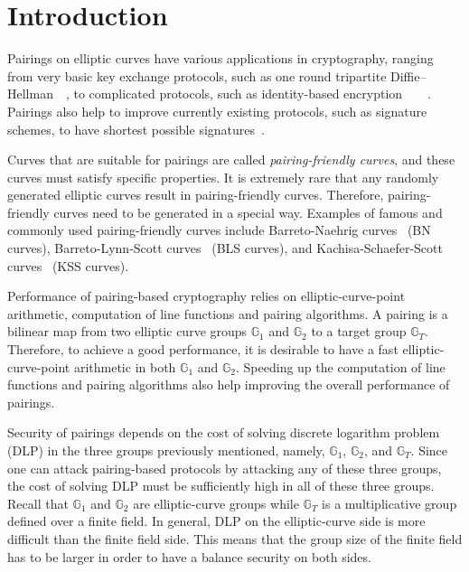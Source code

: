 \section{Introduction}
\label{sec:intro}

Pairings on elliptic curves have various applications in cryptography,
ranging from very basic key exchange protocols,
such as one round tripartite Diffie--Hellman~\cite{2000/joux-ants}~\cite{2004/joux-tripartite},
to complicated protocols, such as
identity-based encryption~\cite{2001/boneh}~\cite{2002/horwitz}~\cite{2002/gentry}~\cite{2005/sahai}.
Pairings also help to improve currently existing protocols, 
such as signature schemes, to have shortest possible signatures~\cite{2004/boneh}.

Curves that are suitable for pairings are called {\emph{pairing-friendly curves}},
and these curves must satisfy specific properties.
It is extremely rare that any randomly generated elliptic curves result in pairing-friendly curves.
Therefore, pairing-friendly curves need to be generated in a special way.
Examples of famous and commonly used pairing-friendly curves include 
Barreto-Naehrig curves~\cite{2006/barreto} (BN curves),
Barreto-Lynn-Scott curves~\cite{2003/bls} (BLS curves), and
Kachisa-Schaefer-Scott curves~\cite{2008/kss} (KSS curves).

Performance of pairing-based cryptography relies on
elliptic-curve-point arithmetic, computation of line functions and pairing algorithms.
A pairing is a bilinear map from two elliptic curve groups $\mathbb{G}_1$ and $\mathbb{G}_2$ to
a target group $\mathbb{G}_T$.
Therefore, to achieve a good performance,
it is desirable to have a fast elliptic-curve-point arithmetic in both $\mathbb{G}_1$ and $\mathbb{G}_2$.
Speeding up the computation of line functions and pairing algorithms also help improving the overall performance of pairings.

Security of pairings depends on the cost of solving discrete logarithm problem (DLP) in the three groups previously mentioned,
namely, $\mathbb{G}_1$, $\mathbb{G}_2$, and $\mathbb{G}_T$.
Since one can attack pairing-based protocols by attacking any of these three groups,
the cost of solving DLP must be sufficiently high in all of these three groups.
Recall that $\mathbb{G}_1$ and $\mathbb{G}_2$ are elliptic-curve groups
while $\mathbb{G}_T$ is a multiplicative group defined over a finite field.
In general, DLP on the elliptic-curve side is more difficult than the finite field side.
This means that the group size of the finite field has to be larger in order to have a balance security on both sides.

